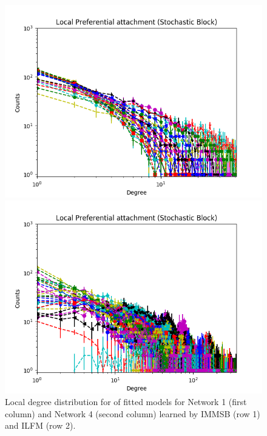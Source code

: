 \begin{figure}[h]
\begin{minipage}{0.24\textwidth}
            \includegraphics[width=\textwidth]{img/corpus/immsb_network4_1}
        \end{minipage}
        \begin{minipage}{0.24\textwidth}
            \includegraphics[width=\textwidth]{img/corpus/ilfm_network4_1}
        \end{minipage}
        \caption {Local degree distribution for of fitted models for Network 1 (first column) and Network 4 (second column) learned by IMMSB (row 1) and ILFM (row 2).} 
	\label{fig:me_local}
\end{figure}

